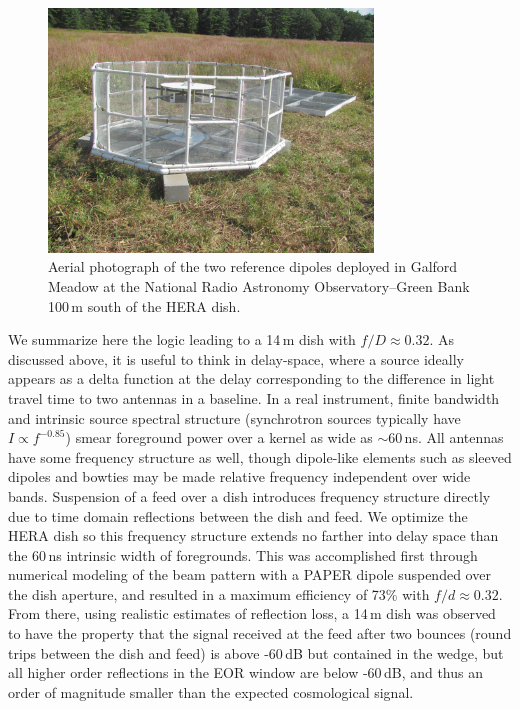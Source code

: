 \documentclass[preprint]{aastex}
\begin{document}
\begin{figure}[h]
\includegraphics[width=3.4in]{feed.jpg}
\caption{Aerial photograph of the two reference dipoles deployed in Galford Meadow at the National Radio Astronomy Observatory--Green Bank 100\,m south of the HERA dish.}
\label{fig:dishphoto}
\end{figure}

We summarize here the logic leading to a 14\,m dish with $f/D\approx0.32$. As discussed 
above, it is useful to think in delay-space, where a source ideally appears as a delta function 
at the delay corresponding to the difference in light travel time to two antennas in a 
baseline. In a real instrument, finite bandwidth and intrinsic source spectral structure 
(synchrotron sources typically have $I\propto f^{-0.85}$) smear foreground power over a 
kernel as wide as $\sim60$\,ns. All antennas have some frequency structure as well, though 
dipole-like elements such as sleeved dipoles and bowties may be made relative frequency 
independent over wide bands. Suspension of a feed over a dish introduces frequency 
structure directly due to time domain reflections between the dish and feed. We optimize the 
HERA dish so this frequency structure extends no farther into delay space than the 60\,ns 
intrinsic width of foregrounds. This was accomplished first through numerical modeling of 
the beam pattern with a PAPER dipole suspended over the dish aperture, and resulted in a 
maximum efficiency of 73\% with $f/d\approx0.32$. From there, using realistic estimates of 
reflection loss, a 14\,m dish was observed to have the property that the signal received at the 
feed after two bounces (round trips between the dish and feed) is above -60\,dB but 
contained in the wedge, but all higher order reflections in the EOR window are below 
-60\,dB, and thus an order of magnitude smaller than the expected cosmological signal. 
\end{document}
